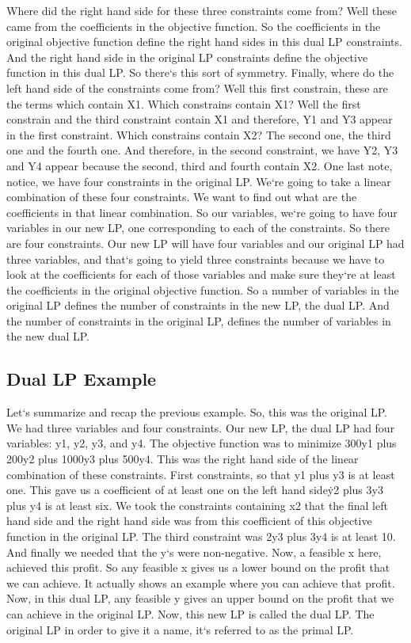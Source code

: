 Where did the right hand side for these three constraints come from? Well these came from the coefficients in the objective function.
So the coefficients in the original objective function define the right hand sides in this dual LP constraints.
And the right hand side in the original LP constraints define the objective function in this dual LP\@.
So there`s this sort of symmetry.
Finally, where do the left hand side of the constraints come from? Well this first constrain, these are the terms which contain X1.
Which constrains contain X1? Well the first constrain and the third constraint contain X1 and therefore, Y1 and Y3 appear in the first constraint.
Which constrains contain X2? The second one, the third one and the fourth one.
And therefore, in the second constraint, we have Y2, Y3 and Y4 appear because the second, third and fourth contain X2.
One last note, notice, we have four constraints in the original LP\@.
We`re going to take a linear combination of these four constraints.
We want to find out what are the coefficients in that linear combination.
So our variables, we`re going to have four variables in our new LP, one corresponding to each of the constraints.
So there are four constraints.
Our new LP will have four variables and our original LP had three variables, and that`s going to yield three constraints because we have to look at the coefficients for each of those variables and make sure they`re at least the coefficients in the original objective function.
So a number of variables in the original LP defines the number of constraints in the new LP, the dual LP\@.
And the number of constraints in the original LP, defines the number of variables in the new dual LP\@.

\subsection{Dual LP Example}
Let`s summarize and recap the previous example.
So, this was the original LP\@.
We had three variables and four constraints.
Our new LP, the dual LP had four variables: y1, y2, y3, and y4.
The objective function was to minimize 300y1 plus 200y2 plus 1000y3 plus 500y4.
This was the right hand side of the linear combination of these constraints.
First constraints, so that y1 plus y3 is at least one.
This gave us a coefficient of at least one on the left hand side\. y2 plus 3y3 plus y4 is at least six.
We took the constraints containing x2 that the final left hand side and the right hand side was from this coefficient of this objective function in the original LP\@.
The third constraint was 2y3 plus 3y4 is at least 10.
And finally we needed that the y`s were non-negative.
Now, a feasible x here, achieved this profit.
So any feasible x gives us a lower bound on the profit that we can achieve.
It actually shows an example where you can achieve that profit.
Now, in this dual LP, any feasible y gives an upper bound on the profit that we can achieve in the original LP\@.
Now, this new LP is called the dual LP\@.
The original LP in order to give it a name, it`s referred to as the primal LP\@.

